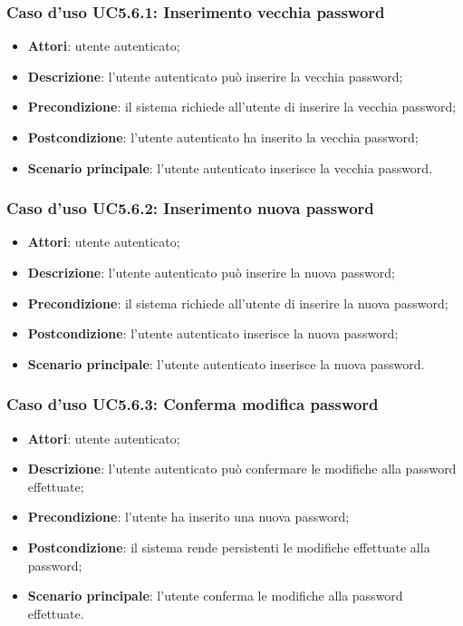 \subsubsection{Caso d'uso UC5.6.1: Inserimento vecchia password}

\begin{itemize}
	\item \textbf{Attori}: utente autenticato;
	\item \textbf{Descrizione}: l'utente autenticato può inserire la vecchia password;
	\item \textbf{Precondizione}: il sistema richiede all'utente di inserire la vecchia password;
	\item \textbf{Postcondizione}: l'utente autenticato ha inserito la vecchia password;
	\item \textbf{Scenario principale}: l'utente autenticato inserisce la vecchia password.
\end{itemize}

\subsubsection{Caso d'uso UC5.6.2: Inserimento nuova password}

\begin{itemize}
	\item \textbf{Attori}: utente autenticato;
	\item \textbf{Descrizione}: l'utente autenticato può inserire la nuova password;
	\item \textbf{Precondizione}: il sistema richiede all'utente di inserire la nuova password;
	\item \textbf{Postcondizione}: l'utente autenticato inserisce la nuova password;
	\item \textbf{Scenario principale}: l'utente autenticato inserisce la nuova password.
\end{itemize}

\subsubsection{Caso d'uso UC5.6.3: Conferma modifica password}

\begin{itemize}
	\item \textbf{Attori}: utente autenticato;
	\item \textbf{Descrizione}: l'utente autenticato può confermare le modifiche alla password effettuate;
	\item \textbf{Precondizione}: l'utente ha inserito una nuova password;
	\item \textbf{Postcondizione}: il sistema rende persistenti le modifiche effettuate alla password;
	\item \textbf{Scenario principale}: l'utente conferma le modifiche alla password effettuate.
\end{itemize}

